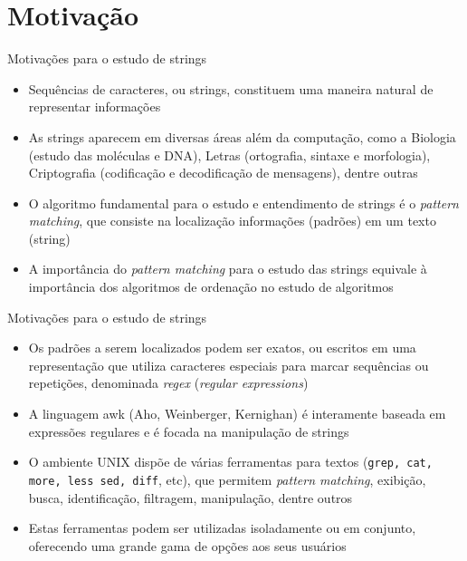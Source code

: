 \section{Motivação}

\begin{frame}[fragile]{Motivações para o estudo de strings}

    \begin{itemize}
        \item Sequências de caracteres, ou strings, constituem uma maneira natural de representar informações

        \item As strings aparecem em diversas áreas além da computação, como a Biologia (estudo das moléculas e DNA), Letras (ortografia, sintaxe e morfologia), Criptografia (codificação e decodificação de mensagens), dentre outras

        \item O algoritmo fundamental para o estudo e entendimento de strings é o \textit{pattern 
        matching}, que consiste na localização informações (padrões) em um texto (string)

        \item A importância do \textit{pattern matching} para o estudo das strings equivale à 
            importância dos algoritmos de ordenação no estudo de algoritmos

    \end{itemize}

\end{frame}

\begin{frame}[fragile]{Motivações para o estudo de strings}

    \begin{itemize}
        \item Os padrões a serem localizados podem ser exatos, ou escritos em uma representação 
            que utiliza caracteres especiais para marcar sequências ou repetições, denominada 
            \textit{regex} (\textit{regular expressions})

        \item A linguagem awk (Aho, Weinberger, Kernighan) é interamente baseada em expressões 
            regulares e é focada na manipulação de strings

        \item O ambiente UNIX dispõe de várias ferramentas para textos (\texttt{grep, cat, more, less sed, diff}, etc), que permitem \textit{pattern matching}, exibição, busca, identificação, filtragem, manipulação, dentre outros

        \item Estas ferramentas podem ser utilizadas isoladamente ou em conjunto, oferecendo uma grande gama de opções aos seus usuários
    \end{itemize}

\end{frame}
